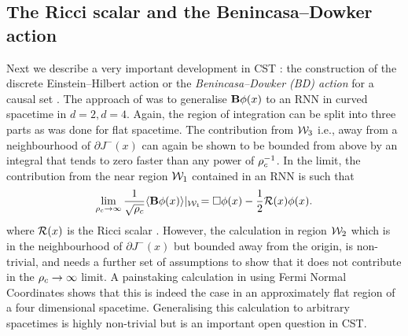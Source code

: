 \subsection{The Ricci scalar and the Benincasa--Dowker action} 
\label{ssec:bdaction}

Next we describe a very important development in CST : the construction of the discrete Einstein--Hilbert action or the
\emph{Benincasa--Dowker (BD) action}  for a causal set \citep{bd,dg}. The approach of \cite{bd} was to generalise
  $\mathbf B\phi(x)$ to an RNN in curved spacetime in $d=2,d=4$. Again, the region of integration can be split into three
  parts as was done for  flat spacetime. The
contribution from $\mathcal W_3$ i.e., away from a neighbourhood of $\partial J^-(x)$ can again be shown to be 
bounded from above by an integral that  tends to zero faster than any power of $\rho_c^{-1}$.   In the limit, the contribution from the
near region $\mathcal W_1 $ contained in an RNN  is such that 
\begin{equation} 
\lim_{\rho_c \rightarrow \infty} \frac{1}{\sqrt{\rho_c }}\langle {\mathbf B\phi(x)} \rangle \lvert_{\mathcal W_1}  = \Box \phi(x) -\frac{1}{2} \mathcal R(x)\phi(x).
\end{equation} 
where $\mathcal R(x)$ is the Ricci scalar \citep{bd,dionthesis}. However, the calculation in region $\mathcal W_2$ which is in the neighbourhood of
$\partial J^-(x)$ but bounded away from the origin,  is non-trivial, and needs a further set of assumptions to show
that it does not contribute in the $\rho_c \rightarrow \infty$ limit.  A painstaking calculation in \cite{bbd} using Fermi Normal Coordinates shows that
this is indeed the case  in an approximately flat region of a four dimensional spacetime.  Generalising this calculation
to arbitrary spacetimes is
highly non-trivial but is an important open question in CST.   


